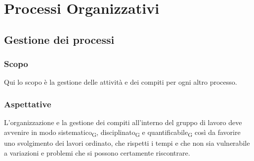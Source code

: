 \section{Processi Organizzativi}
\label{organizzativi}


\subsection{Gestione dei processi}
    \subsubsection{Scopo}
    Qui lo scopo è la gestione delle attività e dei compiti per ogni altro processo.
    \subsubsection{Aspettative}
    L'organizzazione e la gestione dei compiti all'interno del gruppo di lavoro deve avvenire in modo \gls{sistematico}\textsubscript{G}, \gls{disciplinato}\textsubscript{G} e \gls{quantificabile}\textsubscript{G} così da favorire uno svolgimento dei lavori ordinato, che rispetti i tempi e che non sia vulnerabile a variazioni e problemi che si possono certamente riscontrare.
